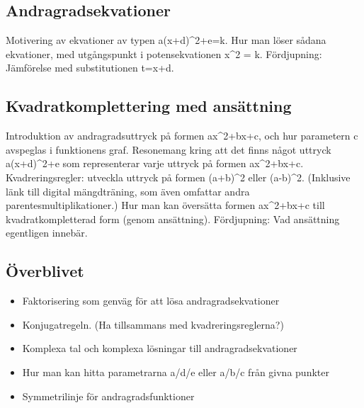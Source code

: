 \documentclass[12pt]{article}
\begin{document}
  \subsection{Andragradsekvationer}
  Motivering av ekvationer av typen a(x+d)^2+e=k.
  Hur man löser sådana ekvationer, med utgångspunkt i potensekvationen x^2 = k.
  Fördjupning: Jämförelse med substitutionen t=x+d.

  \subsection{Kvadratkomplettering med ansättning}
  Introduktion av andragradsuttryck på formen ax^2+bx+c, och hur parametern c avspeglas i funktionens graf.
  Resonemang kring att det finns något uttryck a(x+d)^2+e som representerar varje uttryck på formen ax^2+bx+c.
  Kvadreringsregler: utveckla uttryck på formen (a+b)^2 eller (a-b)^2.
  (Inklusive länk till digital mängdträning, som även omfattar andra parentesmultiplikationer.)
  Hur man kan översätta formen ax^2+bx+c till kvadratkompletterad form (genom ansättning).
  Fördjupning: Vad ansättning egentligen innebär.
  
  \subsection{Överblivet}
  \begin{itemize}
    \item Faktorisering som genväg för att lösa andragradsekvationer
    \item Konjugatregeln. (Ha tillsammans med kvadreringsreglerna?)
    \item Komplexa tal och komplexa lösningar till andragradsekvationer
    \item Hur man kan hitta parametrarna a/d/e eller a/b/c från givna punkter
    \item Symmetrilinje för andragradsfunktioner
  \end{itemize}
\end{document}
